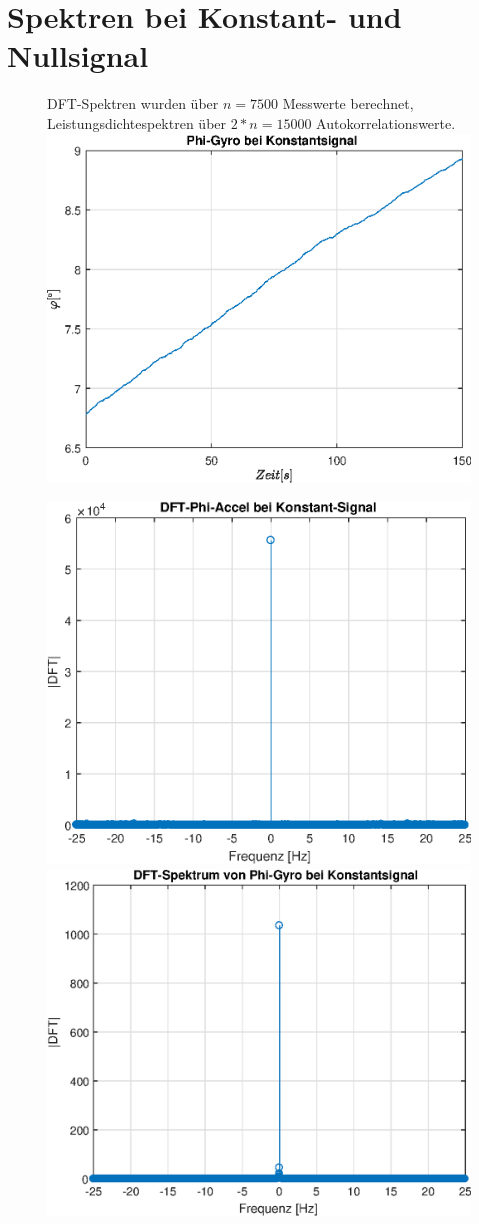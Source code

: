 \documentclass{article}
\begin{document}
\tableofcontents

\newpage
\section{Spektren bei Konstant- und Nullsignal}
\begin{figure}[h!]
DFT-Spektren wurden über $n=7500$ Messwerte berechnet, Leistungsdichtespektren über $2*n=15000$ Autokorrelationswerte.
\centering
\includegraphics[width=0.5\linewidth]{img/phi_g_constsig}
\end{figure}
\begin{figure}[h!]
\includegraphics[width=0.5\linewidth]{img/dft_phi_a_constsig}
\includegraphics[width=0.5\linewidth]{img/dft_phi_g_constsig}
\end{figure}
\end{document}
